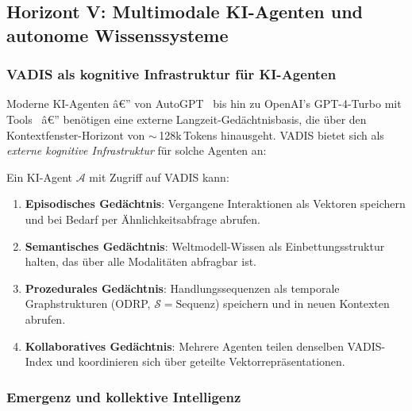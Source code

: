 ﻿\documentclass[12pt,a4paper]{article}
\begin{document}
\subsection{Horizont V: Multimodale KI-Agenten und
            autonome Wissenssysteme}
\label{sub:horizont5}

\subsubsection{VADIS als kognitive Infrastruktur für KI-Agenten}

Moderne KI-Agenten â€” von AutoGPT~\cite{significant2023autogpt}
bis hin zu OpenAI's GPT-4-Turbo mit Tools~\cite{openai2023gpt4} â€”
benötigen eine externe Langzeit-Gedächtnisba\-sis, die über
den Kontextfenster-Horizont von $\sim$\,128k\,Tokens hinausgeht.
VADIS bietet sich als \emph{externe kognitive
Infrastruktur} für solche Agenten an:

\begin{tcolorbox}[keybox, title={Vision: VADIS als Arbeitsgedächtnis
                  für KI-Agenten}]
\small
Ein KI-Agent $\mathcal{A}$ mit Zugriff auf VADIS kann:
\begin{enumerate}[leftmargin=1.2em, itemsep=1pt, topsep=2pt]
  \item \textbf{Episodisches Gedächtnis}: Vergangene
        Interaktionen als Vektoren speichern und bei
        Bedarf per Ähnlichkeitsabfrage abrufen.
  \item \textbf{Semantisches Gedächtnis}: Weltmodell-Wissen
        als Einbettungsstruktur halten, das über
        alle Modalitäten abfragbar ist.
  \item \textbf{Prozedurales Gedächtnis}: Handlungssequenzen
        als temporale Graphstrukturen (ODRP, $\mathcal{S}=\text{Sequenz}$)
        speichern und in neuen Kontexten abrufen.
  \item \textbf{Kollaboratives Gedächtnis}: Mehrere Agenten
        teilen denselben VADIS-Index und koordinieren
        sich über geteilte Vektorrepräsentationen.
\end{enumerate}
\end{tcolorbox}

\subsubsection{Emergenz und kollektive Intelligenz}
\end{document}
